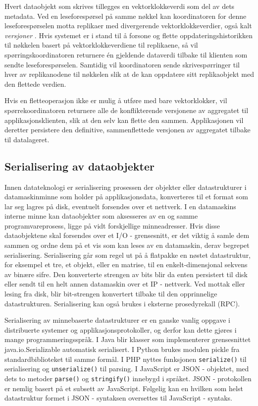 Hvert dataobjekt som skrives tillegges en vektorklokkeverdi som del av dets metadata. Ved en leseforespørsel på samme nøkkel kan koordinatoren for denne leseforespørselen motta replikaer med divergerende vektorklokkeverdier, også kalt \emph{versjoner} \citep{kreps2009}. Hvis systemet er i stand til å forsone og flette oppdateringshistorikken til nøkkelen basert på vektorklokkeverdiene til replikaene, så vil spørringskoordinatoren returnere én gjeldende dataverdi tilbake til klienten som sendte leseforespørselen. Samtidig vil koordinatoren sende skrivespørringer til hver av replikanodene til nøkkelen slik at de kan oppdatere sitt replikaobjekt med den flettede verdien.

Hvis en fletteoperasjon ikke er mulig å utføre med bare vektorklokker, vil spørrekoordinatoren returnere alle de konflikterende versjonene av aggregatet til applikasjonsklienten, slik at den selv kan flette den sammen. Applikasjonen vil deretter persistere den definitive, sammenflettede versjonen av aggregatet tilbake til datalageret.

\subsection{Serialisering av dataobjekter}
Innen datateknologi er serialisering prosessen der objekter eller datastrukturer i datamaskinminne som holder på applikasjonsdata, konverteres til et format som lar seg lagres på disk, eventuelt forsendes over et nettverk. I en datamaskins interne minne kan dataobjekter som aksesseres av en og samme programvareprosess, ligge på vidt forskjellige minneadresser. Hvis disse dataobjektene skal forsendes over et I/O - grensesnitt, er det viktig å samle dem sammen og ordne dem på et vis som kan leses av en datamaskin, derav begrepet serialisering. Serialisering går som regel ut på å flatpakke en nøstet datastruktur, for eksempel et tre, et objekt, eller en matrise, til en enkelt-dimensjonal sekvens av binære sifre. Den konverterte strengen av bits blir da enten persistert til disk eller sendt til en helt annen datamaskin over et IP - nettverk. Ved mottak eller lesing fra disk, blir bit-strengen konvertert tilbake til den opprinnelige datastrukturen. Serialisering kan også brukes i eksterne prosedyrekall (RPC).

Serialisering av minnebaserte datastrukturer er en ganske vanlig oppgave i distribuerte systemer og applikasjonsprotokoller, og derfor kan dette gjøres i mange programmeringsspråk. I Java blir klasser som implementerer grensesnittet java.io.Serializable automatisk serialisert. I Python brukes modulen pickle fra standardbiblioteket til samme formål. I PHP nyttes funksjonen \texttt{serialize()} til serialisering og \texttt{unserialize()} til parsing. I JavaScript er JSON - objektet, med dets to metoder \texttt{parse()} og \texttt{stringify()} innebygd i språket. JSON - protokollen er nemlig basert på et subsett av JavaScript. Følgelig kan en hvilken som helst datastruktur formet i JSON - syntaksen oversettes til JavaScript - syntaks.

